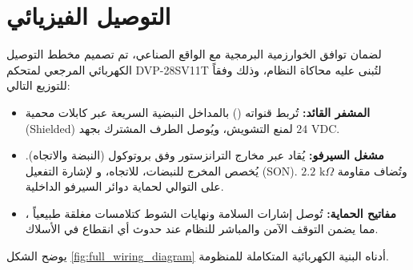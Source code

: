 \documentclass[12pt,a4paper,fleqn]{report}
\begin{document}
\chapter{التوصيل الفيزيائي }
\label{ch:plc_wiring}

لضمان توافق الخوارزمية البرمجية مع الواقع الصناعي، تم تصميم مخطط التوصيل الكهربائي المرجعي لمتحكم \textenglish{DVP-28SV11T} لتُبنى عليه محاكاة النظام، وذلك وفقاً للتوزيع التالي:

\begin{itemize}
    \item \textbf{المشفر القائد:} تُربط قنواته () بالمداخل النبضية السريعة  عبر كابلات محمية (\textenglish{Shielded}) لمنع التشويش، ويُوصل الطرف المشترك  بجهد $24\text{ VDC}$.
    \item \textbf{مشغل السيرفو:} يُقاد عبر مخارج الترانزستور وفق بروتوكول (النبضة والاتجاه). يُخصص المخرج  للنبضات،  للاتجاه، و  لإشارة التفعيل (\textenglish{SON}). وتُضاف مقاومة $2.2\text{ k}\Omega$ على التوالي لحماية دوائر السيرفو الداخلية.
    \item \textbf{مفاتيح الحماية:} تُوصل إشارات السلامة ونهايات الشوط  كتلامسات مغلقة طبيعياً ، مما يضمن التوقف الآمن والمباشر للنظام عند حدوث أي انقطاع في الأسلاك.
\end{itemize}

يوضح الشكل \ref{fig:full_wiring_diagram} أدناه البنية الكهربائية المتكاملة للمنظومة.
\end{document}
